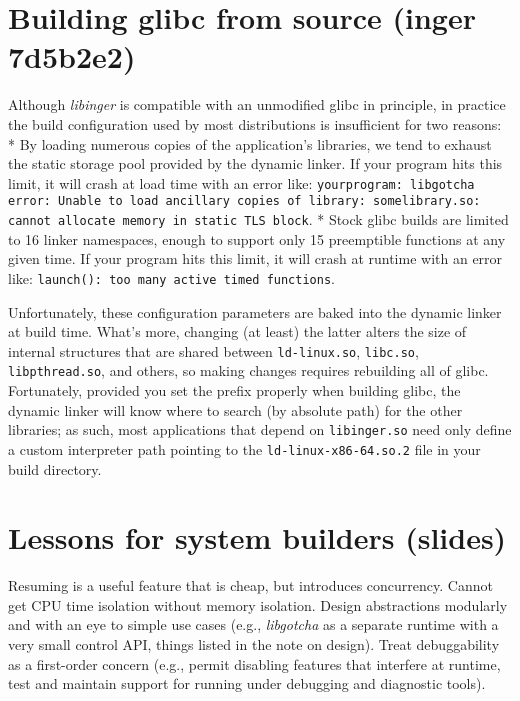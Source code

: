 \documentclass[12pt,letterpaper]{book}
\begin{document}
\section{Building glibc from source (inger 7d5b2e2)}

Although \textit{libinger} is compatible with an unmodified glibc in principle, in practice the build
configuration used by most distributions is insufficient for two reasons:
 * By loading numerous copies of the application's libraries, we tend to exhaust the static storage
   pool provided by the dynamic linker.  If your program hits this limit, it will crash at load time
   with an error like: \texttt{yourprogram: libgotcha error: Unable to load ancillary copies of library:
   somelibrary.so: cannot allocate memory in static TLS block}.
 * Stock glibc builds are limited to 16 linker namespaces, enough to support only 15 preemptible
   functions at any given time.  If your program hits this limit, it will crash at runtime with an
   error like: \texttt{launch(): too many active timed functions}.

Unfortunately, these configuration parameters are baked into the dynamic linker at build time.
What's more, changing (at least) the latter alters the size of internal structures that are shared
between \texttt{ld-linux.so}, \texttt{libc.so}, \texttt{libpthread.so}, and others, so making changes requires rebuilding
all of glibc.  Fortunately, provided you set the prefix properly when building glibc, the dynamic
linker will know where to search (by absolute path) for the other libraries; as such, most
applications that depend on \texttt{libinger.so} need only define a custom interpreter path pointing to the
\texttt{ld-linux-x86-64.so.2} file in your build directory.


\section{Lessons for system builders (slides)}

Resuming is a useful feature that is cheap, but introduces concurrency.
Cannot get CPU time isolation without memory isolation.
Design abstractions modularly and with an eye to simple use cases (e.g., \textit{libgotcha} as a separate
runtime with a very small control API, things listed in the note on design).
Treat debuggability as a first-order concern (e.g., permit disabling features that interfere at
runtime, test and maintain support for running under debugging and diagnostic tools).
\end{document}
